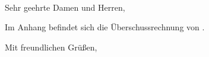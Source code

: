 \documentclass[a4paper, 12pt, KOMAold]{scrlttr2}
\begin{document}
    \begin{letter}{\Empfaenger \\ \EStrasse \\ \EPLZ~\EOrt}
    \date{\today}%
    \subject{Einnahmenüberschussrechnung \Year}
    \opening{Sehr geehrte Damen und Herren,}

    Im Anhang befindet sich die Überschussrechnung von \Year. 

    \closing{Mit freundlichen Grüßen,}
    \end{letter}

    
\end{document}
